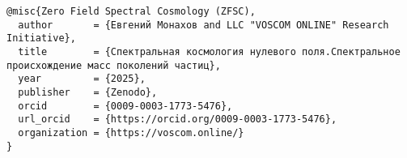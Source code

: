 \documentclass[12pt,a4paper]{article}
\begin{document}
\begin{verbatim}
@misc{Zero Field Spectral Cosmology (ZFSC),
  author       = {Евгений Монахов and LLC "VOSCOM ONLINE" Research Initiative},
  title        = {Спектральная космология нулевого поля.Спектральное происхождение масс поколений частиц},
  year         = {2025},
  publisher    = {Zenodo},
  orcid        = {0009-0003-1773-5476},
  url_orcid    = {https://orcid.org/0009-0003-1773-5476},
  organization = {https://voscom.online/}
}
\end{verbatim}
\end{document}
